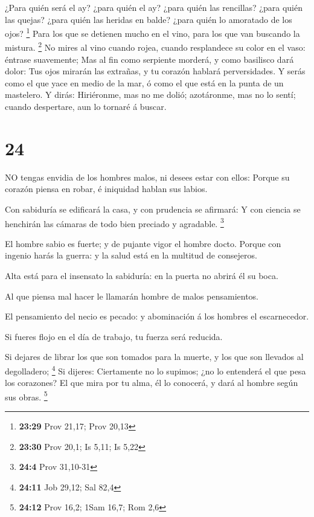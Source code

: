  ¿Para quién será el ay? ¿para quién el ay? ¿para quién las
rencillas? ¿para quién las quejas? ¿para quién las heridas en balde?
¿para quién lo amoratado de los ojos? \footnote{\textbf{23:29} Prov
  21,17; Prov 20,13}  Para los que se detienen mucho en el
vino, para los que van buscando la mistura. \footnote{\textbf{23:30}
  Prov 20,1; Is 5,11; Is 5,22}  No mires al vino cuando
rojea, cuando resplandece su color en el vaso: éntrase suavemente;
 Mas al fin como serpiente morderá, y como basilisco dará
dolor:  Tus ojos mirarán las extrañas, y tu corazón hablará
perversidades.  Y serás como el que yace en medio de la
mar, ó como el que está en la punta de un mastelero.  Y
dirás: Hiriéronme, mas no me dolió; azotáronme, mas no lo sentí; cuando
despertare, aun lo tornaré á buscar.

\hypertarget{section-23}{%
\section{24}\label{section-23}}

 NO tengas envidia de los hombres malos, ni desees estar con
ellos:  Porque su corazón piensa en robar, é iniquidad
hablan sus labios.

 Con sabiduría se edificará la casa, y con prudencia se
afirmará:  Y con ciencia se henchirán las cámaras de todo
bien preciado y agradable. \footnote{\textbf{24:4} Prov 31,10-31}

 El hombre sabio es fuerte; y de pujante vigor el hombre
docto.  Porque con ingenio harás la guerra: y la salud está
en la multitud de consejeros.

 Alta está para el insensato la sabiduría: en la puerta no
abrirá él su boca.

 Al que piensa mal hacer le llamarán hombre de malos
pensamientos.

 El pensamiento del necio es pecado: y abominación á los
hombres el escarnecedor.

 Si fueres flojo en el día de trabajo, tu fuerza será
reducida.

 Si dejares de librar los que son tomados para la muerte, y
los que son llevados al degolladero; \footnote{\textbf{24:11} Job 29,12;
  Sal 82,4}  Si dijeres: Ciertamente no lo supimos; ¿no lo
entenderá el que pesa los corazones? El que mira por tu alma, él lo
conocerá, y dará al hombre según sus obras. \footnote{\textbf{24:12}
  Prov 16,2; 1Sam 16,7; Rom 2,6}

